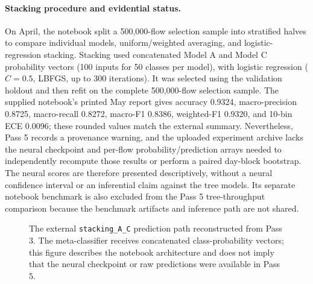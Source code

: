 \documentclass[conference]{IEEEtran}
\begin{document}
\paragraph{Stacking procedure and evidential status.}
On April, the notebook split a 500,000-flow selection sample into stratified halves to compare individual models, uniform/weighted averaging, and logistic-regression stacking. Stacking used concatenated Model A and Model C probability vectors (100 inputs for 50 classes per model), with logistic regression ($C=0.5$, LBFGS, up to 300 iterations). It was selected using the validation holdout and then refit on the complete 500,000-flow selection sample. The supplied notebook's printed May report gives accuracy 0.9324, macro-precision 0.8725, macro-recall 0.8272, macro-F1 0.8386, weighted-F1 0.9320, and 10-bin ECE 0.0096; these rounded values match the external summary. Nevertheless, Pass 5 records a provenance warning, and the uploaded experiment archive lacks the neural checkpoint and per-flow probability/prediction arrays needed to independently recompute those results or perform a paired day-block bootstrap. The neural scores are therefore presented descriptively, without a neural confidence interval or an inferential claim against the tree models. Its separate notebook benchmark is also excluded from the Pass 5 tree-throughput comparison because the benchmark artifacts and inference path are not shared.

\begin{figure}[t]
\centering
{}
\caption{The external \texttt{stacking\_A\_C} prediction path reconstructed from Pass 3. The meta-classifier receives concatenated class-probability vectors; this figure describes the notebook architecture and does not imply that the neural checkpoint or raw predictions were available in Pass 5.}
\label{fig:neural_stack}
\end{figure}
\end{document}
